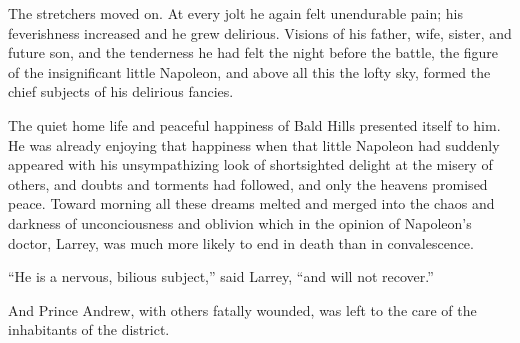 The stretchers moved on. At every jolt he again felt unendurable
pain; his feverishness increased and he grew delirious. Visions
of his father, wife, sister, and future son, and the tenderness
he had felt the night before the battle, the figure of the
insignificant little Napoleon, and above all this the lofty sky,
formed the chief subjects of his delirious fancies.

The quiet home life and peaceful happiness of Bald Hills
presented itself to him. He was already enjoying that happiness
when that little Napoleon had suddenly appeared with his
unsympathizing look of shortsighted delight at the misery of
others, and doubts and torments had followed, and only the
heavens promised peace. Toward morning all these dreams melted
and merged into the chaos and darkness of unconciousness and
oblivion which in the opinion of Napoleon's doctor, Larrey, was
much more likely to end in death than in convalescence.

``He is a nervous, bilious subject,'' said Larrey, ``and will not
recover.''

And Prince Andrew, with others fatally wounded, was left to the
care of the inhabitants of the district.

